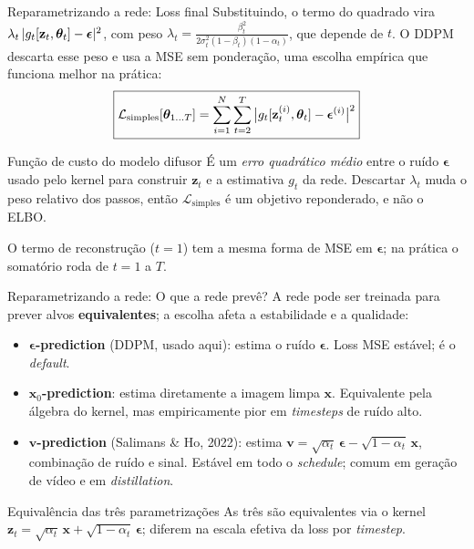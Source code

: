 \documentclass[aspectratio=169,xcolor=dvipsnames]{beamer}
\begin{document}
  \begin{frame}{Reparametrizando a rede: Loss final}
    Substituindo, o termo do quadrado vira
    $\lambda_t\,|g_t[\mathbf{z}_t,\bm{\theta}_t] - \boldsymbol{\epsilon}|^{2}$, com peso
    $\lambda_t = \tfrac{\beta_t^{2}}{2\sigma_t^{2}(1-\beta_t)(1-\alpha_t)}$,
    que depende de $t$. O DDPM descarta esse peso e usa a MSE sem
    ponderação, uma escolha empírica que funciona melhor na prática:
    \vspace{0.3em}
    \[
      \boxed{
        \mathcal{L}_{\text{simples}}[\bm{\theta}_{1\ldots T}] = \sum_{i=1}^{N}\sum_{t=2}^{T} \big|g_t[\mathbf{z}_t^{(i)},\bm{\theta}_t] - \boldsymbol{\epsilon}^{(i)}\big|^{2}
      }
    \]
    \vspace{0.3em}
    \begin{block}{Função de custo do modelo difusor}
      É um \emph{erro quadrático médio} entre o ruído $\boldsymbol{\epsilon}$ usado
      pelo kernel para construir $\mathbf{z}_t$ e a estimativa $g_t$ da rede.
      Descartar $\lambda_t$ muda o peso relativo dos passos, então
      $\mathcal{L}_{\text{simples}}$ é um objetivo reponderado, e não o
      ELBO.
    \end{block}
    \vspace{0.2em}
    \footnotesize O termo de reconstrução ($t=1$) tem a mesma forma de MSE
    em $\boldsymbol{\epsilon}$; na prática o somatório roda de $t=1$ a $T$.
  \end{frame}

  \begin{frame}{Reparametrizando a rede: O que a rede prevê?}
    A rede pode ser treinada para prever alvos \textbf{equivalentes}; a
    escolha afeta a estabilidade e a qualidade:
    \vspace{0.3em}
    \begin{itemize}
      \item \textbf{$\boldsymbol{\epsilon}$-prediction} (DDPM, usado aqui): estima o
      ruído $\boldsymbol{\epsilon}$. Loss MSE estável; é o \emph{default}.
      \item \textbf{$\mathbf{x}_0$-prediction}: estima diretamente a imagem limpa
      $\mathbf{x}$. Equivalente pela álgebra do kernel, mas empiricamente pior em
      \emph{timesteps} de ruído alto.
      \item \textbf{$\mathbf{v}$-prediction} (Salimans \& Ho, 2022): estima
      $\mathbf{v} = \sqrt{\alpha_t}\,\boldsymbol{\epsilon} - \sqrt{1-\alpha_t}\,\mathbf{x}$, combinação de
      ruído e sinal. Estável em todo o \emph{schedule}; comum em geração de
      vídeo e em \emph{distillation}.
    \end{itemize}
    \begin{block}{Equivalência das três parametrizações}
      As três são equivalentes via o kernel
      $\mathbf{z}_t = \sqrt{\alpha_t}\,\mathbf{x} + \sqrt{1-\alpha_t}\,\boldsymbol{\epsilon}$; diferem na
      escala efetiva da loss por \emph{timestep}.
    \end{block}
  \end{frame}
\end{document}
